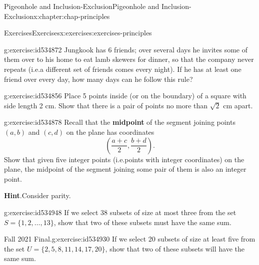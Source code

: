 \documentclass[oneside,10pt,]{book}
\newcommand{\blocktitlefont}{\relax}
\newcommand{\terminology}[1]{\textbf{#1}}
\numberwithin{equation}{section}
\begin{document}
\begin{chapterptx}{Pigeonhole and Inclusion-Exclusion}{}{Pigeonhole and Inclusion-Exclusion}{}{}{x:chapter:chap-principles}
\begin{exercises-section}{Exercises}{}{Exercises}{}{}{x:exercises:exercises-principles}
\begin{divisionexercise}{5}{}{}{g:exercise:id534872}
Jungkook has 6 friends; over several days he invites some of them over to his home to eat lamb skewers for dinner, so that the company never repeats (i.e.\@ a different set of friends comes every night). If he has at least one friend over every day, how many days can he follow this rule?%
\par
%
\end{divisionexercise}%
\begin{divisionexercise}{6}{}{}{g:exercise:id534856}%
Place 5 points inside (or on the boundary) of a square with side length 2 cm. Show that there is a pair of points no more than \(\sqrt{2}\) cm apart.%
\begin{sidebyside}{1}{0.425}{0.425}{0}%
\begin{sbspanel}{0.15}%
%
\end{sbspanel}%
\end{sidebyside}%
\end{divisionexercise}%
\begin{divisionexercise}{7}{}{}{g:exercise:id534878}%
Recall that the \terminology{midpoint} of the segment joining points \((a,b)\) and \((c,d)\) on the plane has coordinates%
\begin{equation*}
\left(\frac{a+c}{2},\frac{b+d}{2}\right)\text{.}
\end{equation*}
Show that given five integer points (i.e.\@ points with integer coordinates) on the plane, the midpoint of the segment joining some pair of them is also an integer point.%
\par\smallskip%
\noindent\textbf{\blocktitlefont Hint}.\hypertarget{g:hint:id534891}{}\quad{}Consider parity.%
\end{divisionexercise}%
\begin{divisionexercise}{8}{}{}{g:exercise:id534948}%
If we select 38 subsets of size at most three from the set \(S = \{1,2,\ldots,13\}\), show that two of these subsets must have the same sum.%
\end{divisionexercise}%
\begin{divisionexercise}{9}{Fall 2021 Final.}{}{g:exercise:id534930}%
If we select 20 subsets of size at least five from the set \(U = \{2,5,8,11,14,17,20\}\), show that two of these subsets will have the same sum.\end{divisionexercise}%

\end{exercises-section}
\end{chapterptx}
\end{document}
